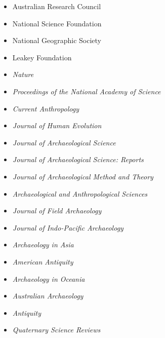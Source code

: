 \begin{itemize}[noitemsep, font=$\bullet$\scshape\bfseries]

\item  Australian Research Council

\item  National Science Foundation

\item  National Geographic Society

\item  Leakey Foundation

\item  \textit{Nature}

\item  \textit{Proceedings of the National Academy of Science}

\item  \textit{Current Anthropology}

\item  \textit{Journal of Human Evolution}

\item  \textit{Journal of Archaeological Science}

\item  \textit{Journal of Archaeological Science: Reports}

\item  \textit{Journal of Archaeological Method and Theory}

\item  \textit{Archaeological and Anthropological Sciences}

\item  \textit{Journal of Field Archaeology}

\item  \textit{Journal of Indo-Pacific Archaeology}

\item  \textit{Archaeology in Asia}

\item  \textit{American Antiquity}

\item  \textit{Archaeology in Oceania}

\item  \textit{Australian Archaeology}

\item  \textit{Antiquity}

\item  \textit{Quaternary Science Reviews}

\end{itemize}
